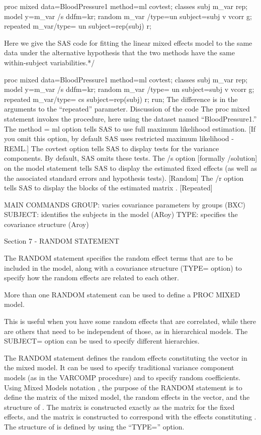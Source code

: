 proc mixed data=BloodPressure1 method=ml covtest;
classes subj m_var rep;
model y=m_var /s ddfm=kr;
random m_var /type=un subject=subj v vcorr g;
repeated m_var/type= un subject=rep(subj) r;


Here we give the SAS code for fitting the linear mixed effects model to the same data under the alternative hypothesis that the two methods have the same within-subject variabilities.*/

proc mixed data=BloodPressure1 method=ml covtest;
classes subj m_var rep;
model y=m_var /s ddfm=kr;
random m_var /type= un subject=subj v vcorr g;
repeated m_var/type= cs subject=rep(subj) r;
run;
The difference is in the arguments to the “repeated” parameter.
Discussion of the code
The proc mixed statement invokes the procedure, here using the dataset named “BloodPressure1.”
The method = ml option tells SAS to use full maximum likelihood estimation. [If you omit this option, by default SAS uses restricted maximum likelihood - REML.]
The covtest option tells SAS to display tests for the variance components.  By default, SAS omits these tests.
The /s option [formally /solution] on the model statement tells SAS to display the estimated fixed effects (as well as the associated standard errors and hypothesis tests). [Random]
The /r option tells SAS to display the blocks of the estimated  matrix . [Repeated]

MAIN COMMANDS
GROUP:		 varies covariance parameters by groups  	(BXC)
SUBJECT:	 identifies the subjects in the model 		(ARoy)
TYPE: 		 specifies the covariance structure 		(Aroy)

Section 7 - RANDOM STATEMENT

The RANDOM statement specifies the random effect terms that are to be included in the model, along with a
covariance structure (TYPE= option) to specify how the random effects are related to each other. 

More than one RANDOM statement can be used to define a PROC MIXED model. 

This is useful when you have some random effects that are correlated, while there are others that need to be independent of those, as in hierarchical models. The SUBJECT= option can be used to specify different hierarchies.

The RANDOM statement defines the random effects constituting the   vector in the mixed model. 
It can be used to specify traditional variance component models (as in the VARCOMP procedure) and to specify random coefficients.
Using Mixed Models notation , the purpose of the RANDOM statement is to define the   matrix of the mixed model, the random effects in the  vector, and the structure of  . 
The  matrix is constructed exactly as the  matrix for the fixed effects, and the  matrix is constructed to correspond with the effects constituting  . 
The structure of  is defined by using the “TYPE=” option. 

